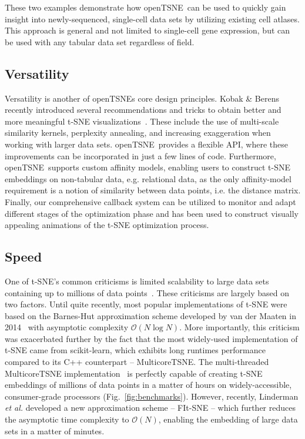 \documentclass[twocolumn]{bmcart}
\newcommand{\opentsne}{\textsf{openTSNE}}
\begin{document}
These two examples demonstrate how \opentsne\ can be used to quickly gain
insight into newly-sequenced, single-cell data sets by utilizing existing cell
atlases. This approach is general and not limited to single-cell gene
expression, but can be used with any tabular data set regardless of field.

\subsection*{Versatility}

Versatility is another of  \opentsne s core design principles. Kobak \& Berens
recently introduced several recommendations and tricks to obtain better and
more meaningful t-SNE visualizations~\cite{kobak2019art}. These include the use
of multi-scale similarity kernels, perplexity annealing, and increasing
exaggeration when working with larger data sets. \opentsne\ provides a flexible
API, where these improvements can be incorporated in just a few lines of code.
Furthermore, \opentsne\ supports custom affinity models, enabling users to
construct t-SNE embeddings on non-tabular data, e.g. relational data, as the
only affinity-model requirement is a notion of similarity between data points,
i.e. the distance matrix.  Finally, our comprehensive callback system can be
utilized to monitor and adapt different stages of the optimization phase and
has been used to construct visually appealing animations of the t-SNE
optimization process.


\subsection*{Speed}

One of t-SNE's common criticisms is limited scalability to large data sets
containing up to millions of data points~\cite{becht2019dimensionality}. These
criticisms are largely based on two factors. Until quite recently, most popular
implementations of t-SNE were based on the Barnes-Hut approximation scheme
developed by van der Maaten in 2014~\cite{van2014accelerating} with asymptotic
complexity $\mathcal{O}(N \log N)$. More importantly, this criticism was
exacerbated further by the fact that the most widely-used implementation of
t-SNE came from \textsf{scikit-learn}, which exhibits long runtimes
performance compared to its C++ counterpart -- \textsf{MulticoreTSNE}. The
multi-threaded \textsf{MulticoreTSNE} implementation~\cite{Ulyanov2016} is
perfectly capable of creating t-SNE embeddings of millions of data points in a
matter of hours on widely-accessible, consumer-grade processors
(Fig.~\ref{fig:benchmarks}). However, recently, Linderman \textit{et al.}
developed a new approximation scheme -- FIt-SNE -- which further reduces the
asymptotic time complexity to $\mathcal{O}(N)$, enabling the embedding of large
data sets in a matter of minutes.
\end{document}
